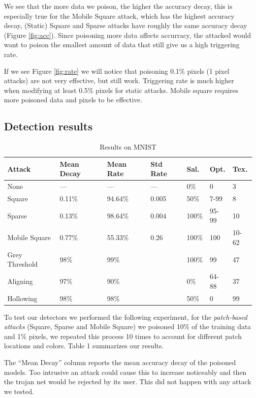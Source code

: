 \documentclass[letterpaper, 10 pt, conference]{ieeeconf}  %
\begin{document}
We see that the more data we poison, the higher the accuracy decay, this is
especially true for the Mobile Square attack, which has the highest accuracy
decay, (Static) Square and Sparse attacks have roughly the same accuracy
decay (Figure \ref{fig:acc}). Since poisoning more data affects accurracy, the attacked would want to poison
the smallest amount of data that still give us a high triggering rate.

If we see Figure \ref{fig:rate} we will notice that poisoning 0.1\% pixels
(1 pixel attacks) are not very effective, but still work. Triggering
rate is much higher when modifying at least 0.5\% pixels for static attacks.
Mobile square requires more poisoned data and pixels to be effective.


\subsection{Detection results}

\begin{table}
\begin{center}
  \begin{tabular}{lllllll}
    \hline
    Attack & Mean Decay & Mean Rate & Std Rate & Sal. & Opt. & Tex.\\
    \hline
    None & --- & ---  & --- & 0\% & 0 & 3\\
    Square & 0.11\% & 94.64\% & 0.005 & 50\% & 7-99 & 8\\
    Sparse & 0.13\% & 98.64\% & 0.004 & 100\% & 95-99 & 10\\
    Mobile Square & 0.77\% & 55.33\% & 0.26 & 100\% & 100 & 10-62\\
    Grey Threshold & 98\% & 99\% & & 100\% & 99 & 47\\
    Aligning & 97\% & 90\% & & 0\% & 64-88 & 37\\
    Hollowing & 98\% & 98\% & & 50\% & 0 & 99\\
    \hline
  \end{tabular}
  \caption{Results on MNIST}
  \end{center}
\end{table}

To test our detectors we performed the following experiment, for the
\textit{patch-based attacks} (Square, Sparse and Mobile Square) we poisoned
10\% of the training data and 1\% pixels, we repeated this process 10 times
to account for different patch locations and colors. Table 1 summarizes our results.

The ``Mean Decay'' column reports the mean accuracy decay of the poisoned
models. Too intrusive an attack could cause this to increase
noticeably and then the trojan net would be rejected by its user.
This did not happen with any attack we tested.
\end{document}
